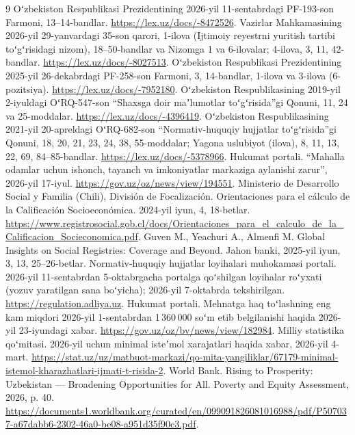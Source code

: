 \documentclass[14pt,a4paper]{extarticle}
\newcommand{\tsize}{\fontsize{12bp}{14.4bp}\selectfont}
\begin{document}
\renewcommand{\refname}{Manbalar}
\begingroup\tsize
\begin{thebibliography}{9}
 Oʻzbekiston Respublikasi Prezidentining 2026-yil 11-sentabrdagi PF-193-son Farmoni, 13–14-bandlar. \url{https://lex.uz/docs/-8472526}.
 Vazirlar Mahkamasining 2026-yil 29-yanvardagi 35-son qarori, 1-ilova (Ijtimoiy reyestrni yuritish tartibi toʻgʻrisidagi nizom), 18–50-bandlar va Nizomga 1 va 6-ilovalar; 4-ilova, 3, 11, 42-bandlar. \url{https://lex.uz/docs/-8027513}.
 Oʻzbekiston Respublikasi Prezidentining 2025-yil 26-dekabrdagi PF-258-son Farmoni, 3, 14-bandlar, 1-ilova va 3-ilova (6-pozitsiya). \url{https://lex.uz/docs/-7952180}.
 Oʻzbekiston Respublikasining 2019-yil 2-iyuldagi OʻRQ-547-son “Shaxsga doir maʼlumotlar toʻgʻrisida”gi Qonuni, 11, 24 va 25-moddalar. \url{https://lex.uz/docs/-4396419}.
 Oʻzbekiston Respublikasining 2021-yil 20-apreldagi OʻRQ-682-son “Normativ-huquqiy hujjatlar toʻgʻrisida”gi Qonuni, 18, 20, 21, 23, 24, 38, 55-moddalar; Yagona uslubiyot (ilova), 8, 11, 13, 22, 69, 84–85-bandlar. \url{https://lex.uz/docs/-5378966}.
 Hukumat portali. “Mahalla odamlar uchun ishonch, tayanch va imkoniyatlar markaziga aylanishi zarur”, 2026-yil 17-iyul. \url{https://gov.uz/oz/news/view/194551}.
 Ministerio de Desarrollo Social y Familia (Chili), División de Focalización. Orientaciones para el cálculo de la Calificación Socioeconómica. 2024-yil iyun, 4, 18-betlar. \url{https://www.registrosocial.gob.cl/docs/Orientaciones_para_el_calculo_de_la_Calificacion_Socieconomica.pdf}.
 Guven M., Yeachuri A., Almenfi M. Global Insights on Social Registries: Coverage and Beyond. Jahon banki, 2025-yil iyun, 3, 13, 25–26-betlar.
 Normativ-huquqiy hujjatlar loyihalari muhokamasi portali. 2026-yil 11-sentabrdan 5-oktabrgacha portalga qoʻshilgan loyihalar roʻyxati (yozuv yaratilgan sana boʻyicha); 2026-yil 7-oktabrda tekshirilgan. \url{https://regulation.adliya.uz}.
 Hukumat portali. Mehnatga haq toʻlashning eng kam miqdori 2026-yil 1-sentabrdan 1\,360\,000 soʻm etib belgilanishi haqida 2026-yil 23-iyundagi xabar. \url{https://gov.uz/oz/bv/news/view/182984}.
 Milliy statistika qoʻmitasi. 2026-yil uchun minimal isteʼmol xarajatlari haqida xabar, 2026-yil 4-mart. \url{https://stat.uz/uz/matbuot-markazi/qo-mita-yangiliklar/67179-minimal-istemol-kharazhatlari-ijmati-t-risida-2}.
 World Bank. Rising to Prosperity: Uzbekistan — Broadening Opportunities for All. Poverty and Equity Assessment, 2026, p. 40. \url{https://documents1.worldbank.org/curated/en/099091826081016988/pdf/P507037-a67dabb6-2302-46a0-be08-a951d35f90c3.pdf}.

\end{thebibliography}
\end{document}
